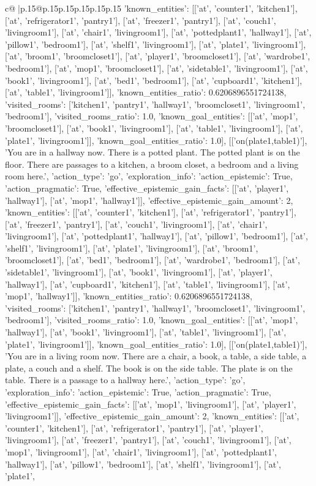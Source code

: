 \documentclass{article}
\begin{document}
{\begin{supertabular}{c@{$\;$}|p{.15\linewidth}@{}p{.15\linewidth}p{.15\linewidth}p{.15\linewidth}p{.15\linewidth}p{.15\linewidth}}
{{{'known_entities': [['at', 'counter1', 'kitchen1'], ['at', 'refrigerator1', 'pantry1'], ['at', 'freezer1', 'pantry1'], ['at', 'couch1', 'livingroom1'], ['at', 'chair1', 'livingroom1'], ['at', 'pottedplant1', 'hallway1'], ['at', 'pillow1', 'bedroom1'], ['at', 'shelf1', 'livingroom1'], ['at', 'plate1', 'livingroom1'], ['at', 'broom1', 'broomcloset1'], ['at', 'player1', 'broomcloset1'], ['at', 'wardrobe1', 'bedroom1'], ['at', 'mop1', 'broomcloset1'], ['at', 'sidetable1', 'livingroom1'], ['at', 'book1', 'livingroom1'], ['at', 'bed1', 'bedroom1'], ['at', 'cupboard1', 'kitchen1'], ['at', 'table1', 'livingroom1']], 'known_entities_ratio': 0.6206896551724138, 'visited_rooms': ['kitchen1', 'pantry1', 'hallway1', 'broomcloset1', 'livingroom1', 'bedroom1'], 'visited_rooms_ratio': 1.0, 'known_goal_entities': [['at', 'mop1', 'broomcloset1'], ['at', 'book1', 'livingroom1'], ['at', 'table1', 'livingroom1'], ['at', 'plate1', 'livingroom1']], 'known_goal_entities_ratio': 1.0}}], [['on(plate1,table1)'], 'You are in a hallway now. There is a potted plant. The potted plant is on the floor. There are passages to a kitchen, a broom closet, a bedroom and a living room here.', {'action_type': 'go', 'exploration_info': {'action_epistemic': True, 'action_pragmatic': True, 'effective_epistemic_gain_facts': [['at', 'player1', 'hallway1'], ['at', 'mop1', 'hallway1']], 'effective_epistemic_gain_amount': 2, 'known_entities': [['at', 'counter1', 'kitchen1'], ['at', 'refrigerator1', 'pantry1'], ['at', 'freezer1', 'pantry1'], ['at', 'couch1', 'livingroom1'], ['at', 'chair1', 'livingroom1'], ['at', 'pottedplant1', 'hallway1'], ['at', 'pillow1', 'bedroom1'], ['at', 'shelf1', 'livingroom1'], ['at', 'plate1', 'livingroom1'], ['at', 'broom1', 'broomcloset1'], ['at', 'bed1', 'bedroom1'], ['at', 'wardrobe1', 'bedroom1'], ['at', 'sidetable1', 'livingroom1'], ['at', 'book1', 'livingroom1'], ['at', 'player1', 'hallway1'], ['at', 'cupboard1', 'kitchen1'], ['at', 'table1', 'livingroom1'], ['at', 'mop1', 'hallway1']], 'known_entities_ratio': 0.6206896551724138, 'visited_rooms': ['kitchen1', 'pantry1', 'hallway1', 'broomcloset1', 'livingroom1', 'bedroom1'], 'visited_rooms_ratio': 1.0, 'known_goal_entities': [['at', 'mop1', 'hallway1'], ['at', 'book1', 'livingroom1'], ['at', 'table1', 'livingroom1'], ['at', 'plate1', 'livingroom1']], 'known_goal_entities_ratio': 1.0}}], [['on(plate1,table1)'], 'You are in a living room now. There are a chair, a book, a table, a side table, a plate, a couch and a shelf. The book is on the side table. The plate is on the table. There is a passage to a hallway here.', {'action_type': 'go', 'exploration_info': {'action_epistemic': True, 'action_pragmatic': True, 'effective_epistemic_gain_facts': [['at', 'mop1', 'livingroom1'], ['at', 'player1', 'livingroom1']], 'effective_epistemic_gain_amount': 2, 'known_entities': [['at', 'counter1', 'kitchen1'], ['at', 'refrigerator1', 'pantry1'], ['at', 'player1', 'livingroom1'], ['at', 'freezer1', 'pantry1'], ['at', 'couch1', 'livingroom1'], ['at', 'mop1', 'livingroom1'], ['at', 'chair1', 'livingroom1'], ['at', 'pottedplant1', 'hallway1'], ['at', 'pillow1', 'bedroom1'], ['at', 'shelf1', 'livingroom1'], ['at', 'plate1', }}}
\end{supertabular}}
\end{document}

